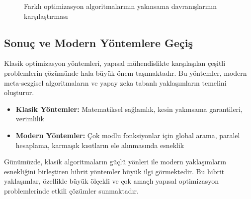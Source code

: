 \begin{figure}
\centering
{}
\caption{Farklı optimizasyon algoritmalarının yakınsama davranışlarının karşılaştırması}
\label{fig:convergence_comparison}
\end{figure}

\subsection{Sonuç ve Modern Yöntemlere Geçiş}

Klasik optimizasyon yöntemleri, yapısal mühendislikte karşılaşılan çeşitli problemlerin çözümünde hala büyük önem taşımaktadır. Bu yöntemler, modern meta-sezgisel algoritmaların ve yapay zeka tabanlı yaklaşımların temelini oluşturur.

\begin{tcolorbox}[title=Klasik ve Modern Yöntemlerin Karşılaştırması]
\begin{itemize}
    \item \textbf{Klasik Yöntemler:} Matematiksel sağlamlık, kesin yakınsama garantileri, verimlilik
    \item \textbf{Modern Yöntemler:} Çok modlu fonksiyonlar için global arama, paralel hesaplama, karmaşık kısıtların ele alınmasında esneklik
\end{itemize}
\end{tcolorbox}

Günümüzde, klasik algoritmaların güçlü yönleri ile modern yaklaşımların esnekliğini birleştiren hibrit yöntemler büyük ilgi görmektedir. Bu hibrit yaklaşımlar, özellikle büyük ölçekli ve çok amaçlı yapısal optimizasyon problemlerinde etkili çözümler sunmaktadır.
